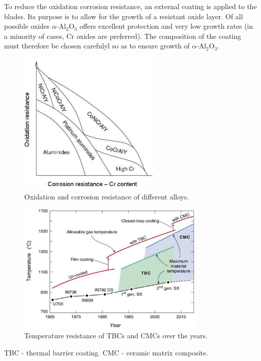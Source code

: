 To reduce the oxidation corrosion resistance, an external coating is applied to the blades. Its purpose is to allow for the growth of a resistant oxide layer. Of all possible oxides $\alpha$-Al$_2$O$_3$ offers excellent protection and very low growth rates (in a minority of cases, Cr oxides are preferred). The composition of the coating must therefore be chosen carefulyl so as to ensure growth of $\alpha$-Al$_2$O$_3$.
\begin{figure}[H]
    \centering
    \includegraphics[width =0.6\textwidth]{img/figure25.png}
    \caption{Oxidation and corrosion resistance of different alloys.}
\end{figure}
\begin{figure}[H]
    \centering
    \includegraphics[width =0.8\textwidth]{img/figure26.png}
    \caption{Temperature resistance of TBCs and CMCs over the years.}
\end{figure}
TBC - thermal barrier coating. CMC - ceramic matrix composite.
